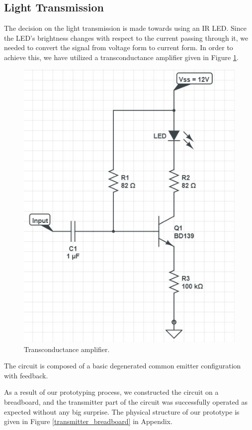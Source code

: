 \documentclass[a4paper,10pt]{IEEEtran}
\begin{document}
\subsection{Light Transmission}
The decision on the light transmission is made towards using an IR LED. Since the LED's brightness changes with respect to the current passing through it, we needed to convert the signal from voltage form to current form. In order to achieve this, we have utilized a transconductance amplifier given in Figure \ref{transconductance}. 
\begin{figure}[htbp!]
    \centering
    \includegraphics[width = 1\linewidth]{Led Driver Circuit.jpg}
    \caption{Transconductance amplifier.}
    \label{transconductance}
\end{figure} 
The circuit is composed of a basic degenerated common emitter configuration with feedback. 

As a result of our prototyping process, we constructed the circuit on a breadboard, and the transmitter part of the circuit was successfully operated as expected without any big surprise. The physical structure of our prototype is given in Figure \ref{transmitter_breadboard} in Appendix.
\end{document}
